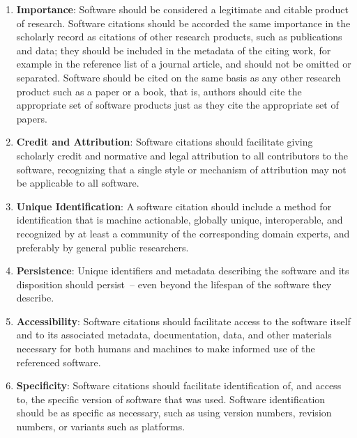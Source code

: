 \documentclass[12pt, oneside]{amsart}
\newcommand{\katznote}[1]{ {\textcolor{blue} { ***DSK: #1 }}} %
\begin{document}

\begin{enumerate}
\item \textbf{Importance}: \label{principle:importance} Software should be
considered a legitimate and citable product of research. Software citations should
be accorded the same importance in the scholarly record as citations of other
research products, such as publications and data; they should be included in the
metadata of the citing work, for example in the reference list of a journal article,
and should not be omitted or separated.
Software should be cited on the same basis as any other research product such as
a paper or a book, that is, authors should cite the appropriate set of software
products just as they cite the appropriate set of papers.

\item \textbf{Credit and Attribution}: \label{principle:credit}
Software citations should facilitate giving scholarly credit and normative
and legal attribution to all contributors to the software, recognizing
that a single style or mechanism of attribution may not be applicable to
all software.

\item \textbf{Unique Identification}: \label{principle:uid}
A software citation should include a method for identification that is
machine actionable, globally unique, interoperable, and recognized by
at least a community of the corresponding domain experts, and preferably by
general public researchers.

\item \textbf{Persistence}: \label{principle:persistence}
Unique identifiers and metadata describing the software and its disposition
should persist~-- even beyond the lifespan of the software they describe.

\item \textbf{Accessibility}: \label{principle:accessibility} Software citations
should facilitate access to the software itself and to its
associated metadata, documentation, data, and other materials necessary
for both humans and machines to make informed use of the referenced software.

\item \textbf{Specificity}: \label{principle:specificity} Software citations should facilitate identification
of, and access to, the specific version of software that was used. Software
identification should be as specific as necessary, such as using version
numbers, revision numbers, or variants such as platforms.
\end{enumerate}
\end{document}
